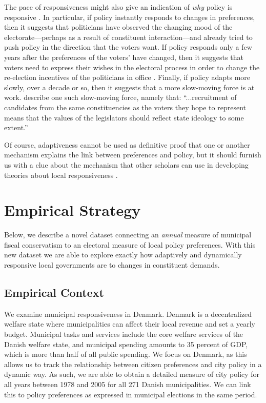 \documentclass[a4paper,12pt]{article}
\begin{document}
The pace of responsiveness might also give an indication of \textit{why} policy is responsive \citep{tausanovitch2019subnational}. In particular, if policy instantly responds to changes in preferences, then it suggests that politicians have observed the changing mood of the electorate---perhaps as a result of constituent interaction---and already tried to push policy in the direction that the voters want. If policy responds only a few years after the preferences of the voters' have changed, then it suggests that voters need to express their wishes in the electoral process in order to change the re-election incentives of the politicians in office \citep[e.g.,][]{boyne2009democracy}. Finally, if policy adapts more slowly, over a decade or so, then it suggests that a more slow-moving force is at work. \citet[][90]{erikson1993statehouse} describe one such slow-moving force, namely that: ``...recruitment of candidates from the same constituencies as  the voters they hope to represent means that the values of the legislators should reflect state ideology to some extent.''

Of course, adaptiveness cannot be used as definitive proof that one or another mechanism explains the link between preferences and policy, but it should furnish us with a clue about the mechanism that other scholars can use in developing theories about local responsiveness \citep{tausanovitch2019subnational}.

\section*{Empirical Strategy}
Below, we describe a novel dataset connecting an \textit{annual} measure of municipal fiscal conservatism to an electoral measure of local policy preferences. With this new dataset we are able to explore exactly how adaptively and dynamically responsive local governments are to changes in constituent demands.

\subsection*{Empirical Context}
We examine municipal responsiveness in Denmark. Denmark is a decentralized welfare state where municipalities can affect their local revenue and set a yearly budget.  Municipal tasks and services include the core welfare services of the Danish welfare state, and municipal spending amounts to 35 percent of GDP, which is more than half of all public spending. We focus on Denmark, as this allows us to track the relationship between citizen preferences and city policy in a dynamic way. As such, we are able to obtain a detailed measure of city policy for all years between 1978 and 2005 for all 271 Danish municipalities.  We can link this to policy preferences as expressed in municipal elections in the same period.
 
\end{document}
